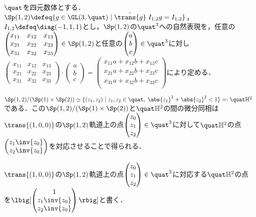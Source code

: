 \begin{nttdef}
  
  $\quat$を四元数体とする．${\Sp(1,2)\defeq \{g\in \GL(3,\quat)\mid \bar{\trans{g}}\; I_{1,2}g = I_{1,2}  \}} $，$I_{1,2} \defeq \diag(-1,1,1) $とし，$\Sp(1,2) $の$\quat^3 $への自然表現を，任意の$\begin{pmatrix}
    x_{11} & x_{12} & x_{13}\\ x_{21} & x_{22} & x_{23}\\ x_{31} & x_{32} & x_{33}
  \end{pmatrix}\in \Sp(1,2)$と任意の$\begin{pmatrix}
    a \\ b \\c
  \end{pmatrix}\in \quat^3 $に対し$
  \begin{pmatrix}
    x_{11} & x_{12} & x_{13}\\ x_{21} & x_{22} & x_{23}\\ x_{31} & x_{32} & x_{33}
  \end{pmatrix}\cdot
  \begin{pmatrix}
    a \\ b \\c
  \end{pmatrix}
  =
  \begin{pmatrix}
    x_{11}a + x_{12}b + x_{13}c\\ x_{21}a + x_{22}b + x_{23}c\\ x_{31}a + x_{32}b + x_{33}c\\    
  \end{pmatrix}
  $により定める．
  
  $\Sp(1,2)/(\Sp(1)\times \Sp(2)) \simeq \{(z_1, z_2)\mid z_1,z_2\in \quat ,\; \abs{z_1}^2 + \abs{z_2}^2   < 1 \} =: \quat\mathbb{H}^2 $である．この$\Sp(1,2)/(\Sp(1)\times \Sp(2)) $と$\quat\mathbb{H}^2$の間の微分同相は$\trans{(1,0,0)} $の$\Sp(1,2)$軌道上の点$
  \begin{pmatrix}
    z_0 \\ z_1 \\ z_2 
  \end{pmatrix}
  \in \quat^3$に対して$\quat\mathbb{H}^2$の点$\begin{pmatrix}
    z_1\inv{z_0} \\ z_2 \inv{z_0}
  \end{pmatrix}$を対応させることで得られる．

  $\trans{(1,0,0)} $の$\Sp(1,2)$軌道上の点$
  \begin{pmatrix}
    z_0 \\ z_1 \\ z_2 
  \end{pmatrix}
  \in \quat^3 $に対応する$\quat\mathbb{H}^2$の点を$\lbig[
  \begin{pmatrix}
    1 \\ z_1\inv{z_0} \\ z_2 \inv{z_0}
  \end{pmatrix}\rbig]
  $と書く．
  

\end{nttdef}

